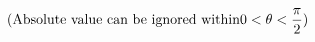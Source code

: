 \documentclass[preview]{standalone}
\begin{document}
\begin{align*}
\text{(Absolute value can be ignored within} 0 < \theta < \frac{\pi}{2}\text)
\end{align*}
\end{document}
